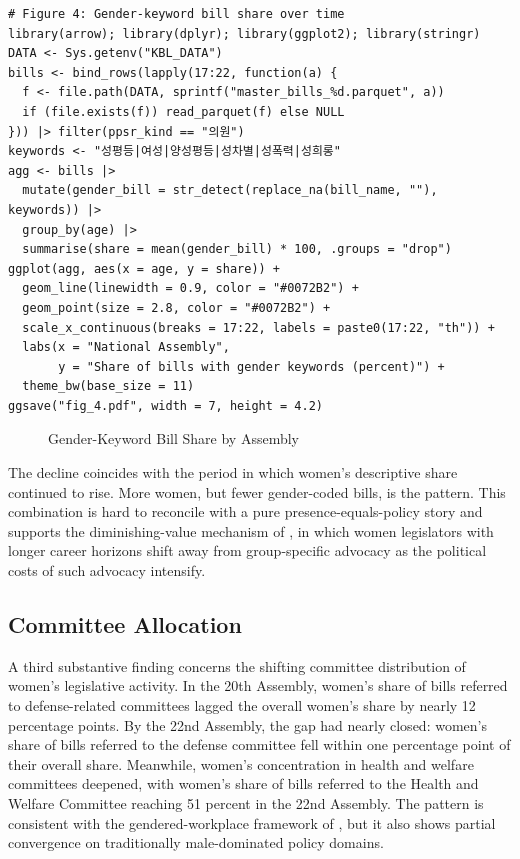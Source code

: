 \documentclass[11pt]{article}
\begin{document}
\begin{verbatim}
# Figure 4: Gender-keyword bill share over time
library(arrow); library(dplyr); library(ggplot2); library(stringr)
DATA <- Sys.getenv("KBL_DATA")
bills <- bind_rows(lapply(17:22, function(a) {
  f <- file.path(DATA, sprintf("master_bills_%d.parquet", a))
  if (file.exists(f)) read_parquet(f) else NULL
})) |> filter(ppsr_kind == "의원")
keywords <- "성평등|여성|양성평등|성차별|성폭력|성희롱"
agg <- bills |>
  mutate(gender_bill = str_detect(replace_na(bill_name, ""), keywords)) |>
  group_by(age) |>
  summarise(share = mean(gender_bill) * 100, .groups = "drop")
ggplot(agg, aes(x = age, y = share)) +
  geom_line(linewidth = 0.9, color = "#0072B2") +
  geom_point(size = 2.8, color = "#0072B2") +
  scale_x_continuous(breaks = 17:22, labels = paste0(17:22, "th")) +
  labs(x = "National Assembly",
       y = "Share of bills with gender keywords (percent)") +
  theme_bw(base_size = 11)
ggsave("fig_4.pdf", width = 7, height = 4.2)
\end{verbatim}

\begin{figure}[H]
\centering
{}
\caption{Gender-Keyword Bill Share by Assembly}
\label{fig:backlash}
\end{figure}

The decline coincides with the period in which women's descriptive share continued to rise. More women, but fewer gender-coded bills, is the pattern. This combination is hard to reconcile with a pure presence-equals-policy story and supports the diminishing-value mechanism of \citet{bailerEtAl2021}, in which women legislators with longer career horizons shift away from group-specific advocacy as the political costs of such advocacy intensify.

\subsection{Committee Allocation}

A third substantive finding concerns the shifting committee distribution of women's legislative activity. In the 20th Assembly, women's share of bills referred to defense-related committees lagged the overall women's share by nearly 12 percentage points. By the 22nd Assembly, the gap had nearly closed: women's share of bills referred to the defense committee fell within one percentage point of their overall share. Meanwhile, women's concentration in health and welfare committees deepened, with women's share of bills referred to the Health and Welfare Committee reaching 51 percent in the 22nd Assembly. The pattern is consistent with the gendered-workplace framework of \citet{eriksonVerge2020}, but it also shows partial convergence on traditionally male-dominated policy domains.
\end{document}
